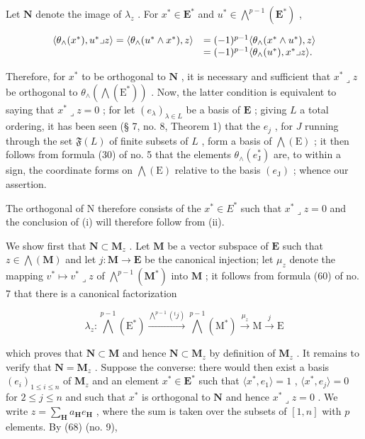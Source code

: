 Let \(\mathbf{N}\) denote the image of \(\lambda_z\) . For \(x^* \in \mathbf{E}^*\) and \(u^* \in \bigwedge^{p-1}(\mathbf{E}^*)\) ,

\[
\begin{array}{r l} \langle \theta_ {\wedge} (x ^ {*}), u ^ {*} \lrcorner z \rangle = \langle \theta_ {\wedge} (u ^ {*} \wedge x ^ {*}), z \rangle & = (- 1) ^ {p - 1} \langle \theta_ {\wedge} (x ^ {*} \wedge u ^ {*}), z \rangle \\ & = (- 1) ^ {p - 1} \langle \theta_ {\wedge} (u ^ {*}), x ^ {*} \lrcorner z \rangle . \end{array}
\]

Therefore, for \(x^*\) to be orthogonal to \(\mathbf{N}\) , it is necessary and sufficient that \(x^* \lrcorner z\) be orthogonal to \(\theta_\wedge (\bigwedge (\mathrm{E}^*))\) . Now, the latter condition is equivalent to saying that \(x^* \lrcorner z = 0\) ; for let \((e_\lambda)_{\lambda \in L}\) be a basis of \(\mathbf{E}\) ; giving \(L\) a total ordering, it has been seen (§ 7, no. 8, Theorem 1) that the \(e_j\) , for \(J\) running through the set \(\mathfrak{F}(L)\) of finite subsets of \(L\) , form a basis of \(\bigwedge (\mathrm{E})\) ; it then follows from formula (30) of no. 5 that the elements \(\theta_{\wedge}(e_{\mathrm{J}}^{*})\) are, to within a sign, the coordinate forms on \(\bigwedge(\mathrm{E})\) relative to the basis \((e_{\mathrm{J}})\) ; whence our assertion.

The orthogonal of N therefore consists of the \(x^{*} \in E^{*}\) such that \(x^{*} \lrcorner z = 0\) and the conclusion of (i) will therefore follow from (ii).

We show first that \(\mathbf{N} \subset \mathbf{M}_z\) . Let \(\mathbf{M}\) be a vector subspace of \(\mathbf{E}\) such that \(z \in \bigwedge (\mathbf{M})\) and let \(j: \mathbf{M} \to \mathbf{E}\) be the canonical injection; let \(\mu_z\) denote the mapping \(v^* \mapsto v^* \lrcorner z\) of \(\bigwedge^{p-1}(\mathbf{M}^*)\) into \(\mathbf{M}\) ; it follows from formula (60) of no. 7 that there is a canonical factorization

\[
\lambda_ {z}: \bigwedge^ {p - 1} (\mathrm{E} ^ {*}) \xrightarrow {\bigwedge^ {p - 1} ({} ^ {t} j)} \bigwedge^ {p - 1} (\mathrm{M} ^ {*}) \xrightarrow {\mu_ {z}} \mathrm{M} \xrightarrow {j} \mathrm{E}
\]

which proves that \(\mathbf{N} \subset \mathbf{M}\) and hence \(\mathbf{N} \subset \mathbf{M}_z\) by definition of \(\mathbf{M}_z\) . It remains to verify that \(\mathbf{N} = \mathbf{M}_z\) . Suppose the converse: there would then exist a basis \((e_i)_{1 \leqslant i \leqslant n}\) of \(\mathbf{M}_z\) and an element \(x^* \in \mathbf{E}^*\) such that \(\langle x^*, e_1 \rangle = 1\) , \(\langle x^*, e_j \rangle = 0\) for \(2 \leqslant j \leqslant n\) and such that \(x^*\) is orthogonal to \(\mathbf{N}\) and hence \(x^* \lrcorner z = 0\) . We write \(z = \sum_{\mathbf{H}} a_{\mathbf{H}} e_{\mathbf{H}}\) , where the sum is taken over the subsets of \([1, n]\) with \(p\) elements. By (68) (no. 9),

